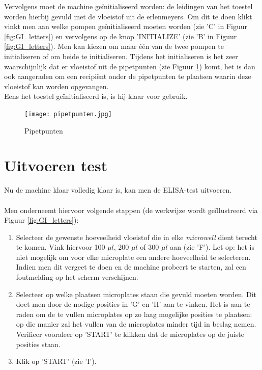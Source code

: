 \documentclass[a4paper,twoside,kulak]{kulakreport} %
\begin{document}
Vervolgens moet de machine geïnitialiseerd worden: de leidingen van het toestel worden hierbij gevuld met de vloeistof uit de erlenmeyers. Om dit te doen klikt vinkt men aan welke pompen geïnitialiseerd moeten worden (zie 'C' in Figuur \ref{fig:GI_letters}) en vervolgens op de knop 'INITIALIZE' (zie 'B' in Figuur \ref{fig:GI_letters}). Men kan kiezen om maar één van de twee pompen te initialiseren of om beide te initialiseren. Tijdens het initialiseren is het zeer waarschijnlijk dat er vloeistof uit de pipetpunten (zie Figuur \ref{fig: pipetpunten}) komt, het is dan ook aangeraden om een recipiënt onder de pipetpunten te plaatsen waarin deze vloeistof kan worden opgevangen. \\
Eens het toestel geïnitialiseerd is, is hij klaar voor gebruik. 

\begin{figure}[h]
	\centering
	\texttt{[image: pipetpunten.jpg]}
	\caption{Pipetpunten}
	\label{fig: pipetpunten}
	\end{figure} 


\chapter*{Uitvoeren test}

Nu de machine klaar volledig klaar is, kan men de ELISA-test uitvoeren. \\ \\
Men onderneemt hiervoor volgende stappen (de werkwijze wordt geïllustreerd via Figuur \ref{fig:GI_letters}):
\begin{enumerate}
	\item Selecteer de gewenste hoeveelheid vloeistof die in elke \textit{microwell} dient terecht te komen. Vink hiervoor 100 $\mu l$, 200 $\mu l$ of 300 $\mu l$ aan (zie 'F'). Let op: het is niet mogelijk om voor elke microplate een andere hoeveelheid te selecteren. Indien men dit vergeet te doen en de machine probeert te starten, zal een foutmelding op het scherm verschijnen.
	\item Selecteer op welke plaatsen microplates staan die gevuld moeten worden. Dit doet men door de nodige posities in 'G' en 'H' aan te vinken. Het is aan te raden om de te vullen microplates op zo laag mogelijke posities te plaatsen: op die manier zal het vullen van de microplates minder tijd in beslag nemen. Verifieer vooraleer op 'START' te klikken dat de microplates op de juiste posities staan.
	\item Klik op 'START' (zie 'I').  
\end{enumerate}
\end{document}
